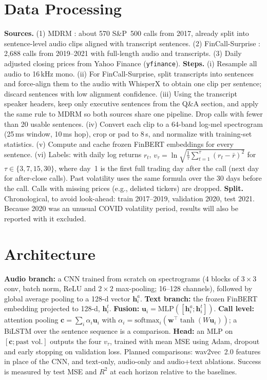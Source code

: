 \documentclass[final]{article}
\begin{document}
\section*{Data Processing}
\textbf{Sources.} (1) MDRM \citep{qin2019what}: about 570 S\&P~500 calls from 2017, already split into
sentence-level audio clips aligned with transcript sentences. (2) FinCall-Surprise \citep{shu2026fincall}:
2,688 calls from 2019--2021 with full-length audio and transcripts. (3) Daily adjusted closing prices from
Yahoo Finance (\texttt{yfinance}).
\textbf{Steps.} (i) Resample all audio to 16\,kHz mono. (ii) For FinCall-Surprise, split transcripts into
sentences and force-align them to the audio with WhisperX \citep{bain2023whisperx} to obtain one clip per
sentence; discard sentences with low alignment confidence. (iii) Using the transcript speaker headers, keep
only executive sentences from the Q\&A section, and apply the same rule to MDRM so both sources share
one pipeline. Drop calls with fewer than 20 usable sentences. (iv) Convert each clip to a 64-band
log-mel spectrogram (25\,ms window, 10\,ms hop), crop or pad to 8\,s, and normalize with training-set
statistics. (v) Compute and cache frozen FinBERT \citep{araci2019finbert} embeddings for every sentence.
(vi) Labels: with daily log returns $r_t$, $v_{\tau} = \ln\sqrt{\tfrac{1}{\tau}\sum_{t=1}^{\tau}(r_t-\bar r)^2}$
for $\tau \in \{3,7,15,30\}$, where day~1 is the first full trading day after the call (next day for
after-close calls). Past volatility uses the same formula over the 30 days before the call. Calls with
missing prices (e.g., delisted tickers) are dropped.
\textbf{Split.} Chronological, to avoid look-ahead: train 2017--2019, validation 2020, test 2021. Because
2020 was an unusual COVID volatility period, results will also be reported with it excluded.

\section*{Architecture}
\textbf{Audio branch:} a CNN trained from scratch on spectrograms (4 blocks of $3\times3$ conv,
batch norm, ReLU and $2\times2$ max-pooling; 16--128 channels), followed by global average pooling to a
128-d vector $\mathbf{h}^a_i$. \textbf{Text branch:} the frozen FinBERT embedding projected to 128-d,
$\mathbf{h}^t_i$. \textbf{Fusion:} $\mathbf{u}_i = \mathrm{MLP}([\mathbf{h}^a_i;\mathbf{h}^t_i])$.
\textbf{Call level:} attention pooling $\mathbf{c} = \sum_i \alpha_i \mathbf{u}_i$ with
$\alpha_i = \mathrm{softmax}_i(\mathbf{w}^\top \tanh(W\mathbf{u}_i))$; a BiLSTM over the sentence
sequence is a comparison. \textbf{Head:} an MLP on $[\mathbf{c}; \text{past vol.}]$ outputs the four
$v_\tau$, trained with mean MSE using Adam, dropout and early stopping on validation loss.
Planned comparisons: wav2vec~2.0 features in place of the CNN, and text-only, audio-only and
audio+text ablations. Success is measured by test MSE and $R^2$ at each horizon relative to the baselines.
\end{document}
